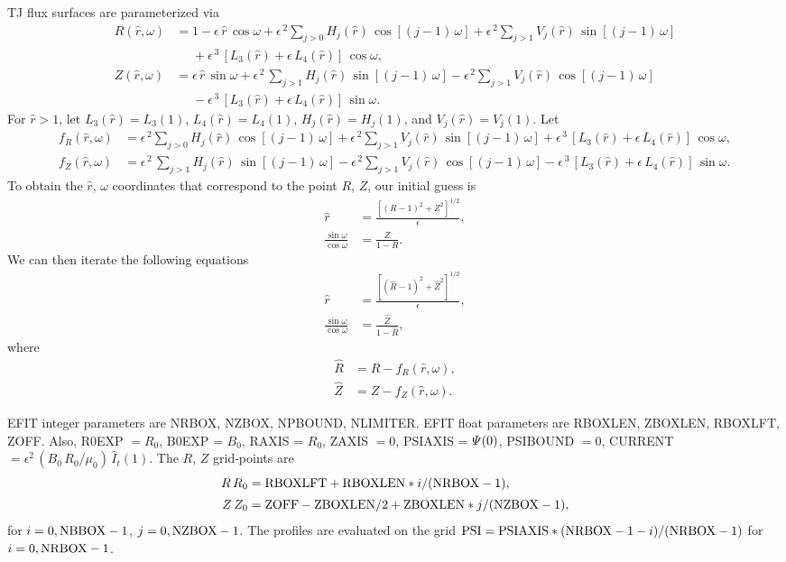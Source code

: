 \documentclass[12pt,prb,aps,notitlepage]{revtex4-1}
\begin{document}
TJ flux surfaces are parameterized via
\begin{align}
R(\hat{r},\omega) &= 1 -\epsilon\,\hat{r}\,\cos\omega + \epsilon^{\,2}\sum_{j>0}H_j(\hat{r})\,\cos[(j-1)\,\omega] + \epsilon^{\,2}\sum_{j>1}V_j(\hat{r})\,\sin[(j-1)\,\omega] \nonumber\\[0.5ex]
&\phantom{=}+\epsilon^{\,3}\,[L_3(\hat{r})+\epsilon\,L_4(\hat{r})]\,\cos\omega,\\[0.5ex]
Z(\hat{r},\omega)&= \epsilon\,\hat{r}\,\sin\omega +\epsilon^{\,2}\,\sum_{j>1}H_j(\hat{r})\,\sin[(j-1)\,\omega]
-\epsilon^{\,2}\sum_{j>1}V_j(\hat{r})\,\cos[(j-1)\,\omega]\nonumber\\[0.5ex]&\phantom{=}-
\epsilon^{\,3}\,[L_3(\hat{r})+\epsilon\,L_4(\hat{r})]\,\sin\omega.
\end{align}
For $\hat{r}>1$, let $L_3(\hat{r}) = L_3(1)$, $L_4(\hat{r})=L_4(1)$, $H_j(\hat{r})= H_j(1)$, and $V_j(\hat{r})= V_j(1)$. Let
\begin{align}
f_R(\hat{r},\omega) &=  \epsilon^{\,2}\sum_{j>0}H_j(\hat{r})\,\cos[(j-1)\,\omega] + \epsilon^{\,2}\sum_{j>1}V_j(\hat{r})\,\sin[(j-1)\,\omega]+\epsilon^{\,3}\,[L_3(\hat{r})+\epsilon\,L_4(\hat{r})]\,\cos\omega,\\[0.5ex]
f_Z(\hat{r},\omega)&= \epsilon^{\,2}\,\sum_{j>1}H_j(\hat{r})\,\sin[(j-1)\,\omega]
-\epsilon^{\,2}\sum_{j>1}V_j(\hat{r})\,\cos[(j-1)\,\omega]-
\epsilon^{\,3}\,[L_3(\hat{r})+\epsilon\,L_4(\hat{r})]\,\sin\omega.
\end{align}
To obtain the $\hat{r}$, $\omega$ coordinates that correspond to the point $R$, $Z$, our initial guess is
\begin{align}
\hat{r} &= \frac{[(R-1)^2+Z^2]^{1/2}}{\epsilon},\\[0.5ex]
\frac{\sin\omega}{\cos\omega} &= \frac{Z}{1-R}.
\end{align}
We can then iterate the following equations
\begin{align}
\hat{r} &= \frac{[(\hat{R}-1)^2+\hat{Z}^2]^{1/2}}{\epsilon},\\[0.5ex]
\frac{\sin\omega}{\cos\omega} &= \frac{\hat{Z}}{1-\hat{R}},
\end{align}
where
\begin{align}
\hat{R} &=R-f_R(\hat{r},\omega),\\[0.5ex]
\hat{Z} &= Z-f_Z(\hat{r},\omega).
\end{align}

EFIT integer parameters are NRBOX, NZBOX, NPBOUND, NLIMITER. EFIT float parameters are RBOXLEN, ZBOXLEN, RBOXLFT, ZOFF. 
Also, R0EXP $= R_0$, B0EXP = $B_0$, RAXIS = $R_0$, ZAXIS $=0$, PSIAXIS = ${\mit\Psi}(0)$, PSIBOUND $=0$, CURRENT$= \epsilon^2\,(B_0\,R_0/\mu_0)\,\hat{I}_t(1)$. The $R$, $Z$ grid-points are 
\begin{align}
R\,R_0&= {\rm RBOXLFT} + {\rm RBOXLEN} *  i /({\rm NRBOX}-1),\\[0.5ex]
Z\,Z_0 &= {\rm ZOFF} - {\rm ZBOXLEN}/2 + {\rm ZBOXLEN} * j /({\rm NZBOX}-1),
\end{align}
for $i=0,{\rm NBBOX}-1$, $j=0,{\rm NZBOX}-1$. The profiles are evaluated on the grid ${\rm PSI} = {\rm PSIAXIS} * ({\rm NRBOX}- 1 - i)/({\rm NRBOX}-1)$
for $i=0, {\rm NRBOX}-1$. 
\end{document}
